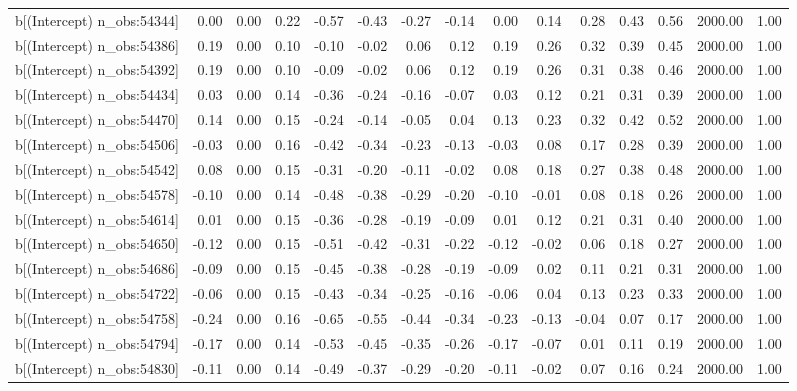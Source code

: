 \begin{table}[ht]
\begin{tabular}{rrrrrrrrrrrrrrr}
  b[(Intercept) n\_obs:54344] & 0.00 & 0.00 & 0.22 & -0.57 & -0.43 & -0.27 & -0.14 & 0.00 & 0.14 & 0.28 & 0.43 & 0.56 & 2000.00 & 1.00 \\ 
  b[(Intercept) n\_obs:54386] & 0.19 & 0.00 & 0.10 & -0.10 & -0.02 & 0.06 & 0.12 & 0.19 & 0.26 & 0.32 & 0.39 & 0.45 & 2000.00 & 1.00 \\ 
  b[(Intercept) n\_obs:54392] & 0.19 & 0.00 & 0.10 & -0.09 & -0.02 & 0.06 & 0.12 & 0.19 & 0.26 & 0.31 & 0.38 & 0.46 & 2000.00 & 1.00 \\ 
  b[(Intercept) n\_obs:54434] & 0.03 & 0.00 & 0.14 & -0.36 & -0.24 & -0.16 & -0.07 & 0.03 & 0.12 & 0.21 & 0.31 & 0.39 & 2000.00 & 1.00 \\ 
  b[(Intercept) n\_obs:54470] & 0.14 & 0.00 & 0.15 & -0.24 & -0.14 & -0.05 & 0.04 & 0.13 & 0.23 & 0.32 & 0.42 & 0.52 & 2000.00 & 1.00 \\ 
  b[(Intercept) n\_obs:54506] & -0.03 & 0.00 & 0.16 & -0.42 & -0.34 & -0.23 & -0.13 & -0.03 & 0.08 & 0.17 & 0.28 & 0.39 & 2000.00 & 1.00 \\ 
  b[(Intercept) n\_obs:54542] & 0.08 & 0.00 & 0.15 & -0.31 & -0.20 & -0.11 & -0.02 & 0.08 & 0.18 & 0.27 & 0.38 & 0.48 & 2000.00 & 1.00 \\ 
  b[(Intercept) n\_obs:54578] & -0.10 & 0.00 & 0.14 & -0.48 & -0.38 & -0.29 & -0.20 & -0.10 & -0.01 & 0.08 & 0.18 & 0.26 & 2000.00 & 1.00 \\ 
  b[(Intercept) n\_obs:54614] & 0.01 & 0.00 & 0.15 & -0.36 & -0.28 & -0.19 & -0.09 & 0.01 & 0.12 & 0.21 & 0.31 & 0.40 & 2000.00 & 1.00 \\ 
  b[(Intercept) n\_obs:54650] & -0.12 & 0.00 & 0.15 & -0.51 & -0.42 & -0.31 & -0.22 & -0.12 & -0.02 & 0.06 & 0.18 & 0.27 & 2000.00 & 1.00 \\ 
  b[(Intercept) n\_obs:54686] & -0.09 & 0.00 & 0.15 & -0.45 & -0.38 & -0.28 & -0.19 & -0.09 & 0.02 & 0.11 & 0.21 & 0.31 & 2000.00 & 1.00 \\ 
  b[(Intercept) n\_obs:54722] & -0.06 & 0.00 & 0.15 & -0.43 & -0.34 & -0.25 & -0.16 & -0.06 & 0.04 & 0.13 & 0.23 & 0.33 & 2000.00 & 1.00 \\ 
  b[(Intercept) n\_obs:54758] & -0.24 & 0.00 & 0.16 & -0.65 & -0.55 & -0.44 & -0.34 & -0.23 & -0.13 & -0.04 & 0.07 & 0.17 & 2000.00 & 1.00 \\ 
  b[(Intercept) n\_obs:54794] & -0.17 & 0.00 & 0.14 & -0.53 & -0.45 & -0.35 & -0.26 & -0.17 & -0.07 & 0.01 & 0.11 & 0.19 & 2000.00 & 1.00 \\ 
  b[(Intercept) n\_obs:54830] & -0.11 & 0.00 & 0.14 & -0.49 & -0.37 & -0.29 & -0.20 & -0.11 & -0.02 & 0.07 & 0.16 & 0.24 & 2000.00 & 1.00 \\ 

\end{tabular}
\end{table}
